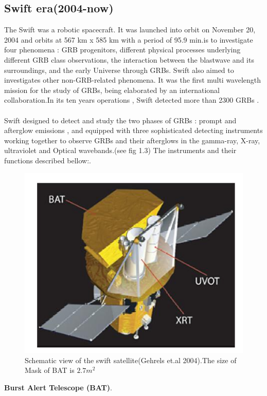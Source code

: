 \subsection{Swift era(2004-now)}
The Swift was a robotic spacecraft. It was launched into orbit on November 20, 2004 
and  orbits at 567 km x 585 km with a period of 95.9 min.is to investigate four phenomena : GRB progenitors, different physical processes underlying different GRB class observations, the interaction between the blastwave and its surroundings, and the early Universe through GRBs. Swift also aimed to investigates other non-GRB-related phenomena. It was the first multi wavelength mission for the study of GRBs, being elaborated by an international collaboration.In its ten years operations , Swift detected more than 2300 GRBs \citep{4} \citep{6}.\\\\
Swift designed to detect and study the two phases of GRBs : prompt and afterglow emissions , and equipped with  three sophisticated detecting instruments working together to observe GRBs and their afterglows in the gamma-ray, X-ray, ultraviolet and Optical wavebands.(see fig 1.3) The  instruments and their functions described bellow:\citep{8}\cite{9}.\\
\begin{figure}[h]
\begin{center}
\includegraphics[scale=0.4]{Figures/fig3.png}
\caption{Schematic view of the swift satellite(Gehrels et.al 2004).The size of Mask of BAT is $2.7m^{2}$  \citep{7}} 
\end{center}
\end{figure}
\textbf{Burst Alert Telescope (BAT)}.\\
